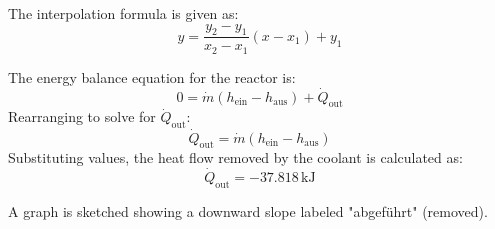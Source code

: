 The interpolation formula is given as:  
\[
y = \frac{y_2 - y_1}{x_2 - x_1} (x - x_1) + y_1
\]  

The energy balance equation for the reactor is:  
\[
0 = \dot{m} (h_{\text{ein}} - h_{\text{aus}}) + \dot{Q}_{\text{out}}
\]  
Rearranging to solve for \( \dot{Q}_{\text{out}} \):  
\[
\dot{Q}_{\text{out}} = \dot{m} (h_{\text{ein}} - h_{\text{aus}})
\]  
Substituting values, the heat flow removed by the coolant is calculated as:  
\[
\dot{Q}_{\text{out}} = -37.818 \, \text{kJ}
\]  

A graph is sketched showing a downward slope labeled "abgeführt" (removed).